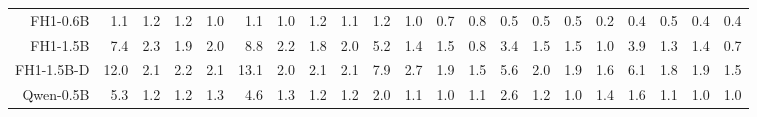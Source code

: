 \documentclass[letterpaper]{article}
\begin{document}
\begin{table}[t]
{\begin{tabular}{rrrrr|rrrr|rrrr|rrrr|rrrr}
FH1-0.6B & \cellcolor[HTML]{F8CCCC}1.1 & \cellcolor[HTML]{F8CDCC}1.2 & \cellcolor[HTML]{F8CDCC}1.2 & \cellcolor[HTML]{F8CCCC}1.0 & \cellcolor[HTML]{F8CCCC}1.1 & \cellcolor[HTML]{F8CCCC}1.0 & \cellcolor[HTML]{F8CDCC}1.2 & \cellcolor[HTML]{F8CCCC}1.1 & \cellcolor[HTML]{F9D0CC}1.2 & \cellcolor[HTML]{F9CFCC}1.0 & \cellcolor[HTML]{F8CCCC}0.7 & \cellcolor[HTML]{F8CDCC}0.8 & \cellcolor[HTML]{F8CECC}0.5 & \cellcolor[HTML]{F8CECC}0.5 & \cellcolor[HTML]{F8CECC}0.5 & \cellcolor[HTML]{F8CCCC}0.2 & \cellcolor[HTML]{F8CCCC}0.4 & \cellcolor[HTML]{F8CDCC}0.5 & \cellcolor[HTML]{F8CCCC}0.4 & \cellcolor[HTML]{F8CCCC}0.4 \\
FH1-1.5B & \cellcolor[HTML]{FDE9CC}7.4 & \cellcolor[HTML]{F9D2CC}2.3 & \cellcolor[HTML]{F9D0CC}1.9 & \cellcolor[HTML]{F9D1CC}2.0 & \cellcolor[HTML]{FEEFCC}8.8 & \cellcolor[HTML]{F9D1CC}2.2 & \cellcolor[HTML]{F9D0CC}1.8 & \cellcolor[HTML]{F9D0CC}2.0 & \cellcolor[HTML]{FDF2CC}5.2 & \cellcolor[HTML]{F9D3CC}1.4 & \cellcolor[HTML]{F9D3CC}1.5 & \cellcolor[HTML]{F8CDCC}0.8 & \cellcolor[HTML]{FCE2CC}3.4 & \cellcolor[HTML]{FAD5CC}1.5 & \cellcolor[HTML]{FAD5CC}1.5 & \cellcolor[HTML]{F9D2CC}1.0 & \cellcolor[HTML]{FDE8CC}3.9 & \cellcolor[HTML]{F9D3CC}1.3 & \cellcolor[HTML]{FAD5CC}1.4 & \cellcolor[HTML]{F9CFCC}0.7 \\
FH1-1.5B-D & \cellcolor[HTML]{EFEFCC}12.0 & \cellcolor[HTML]{F9D1CC}2.1 & \cellcolor[HTML]{F9D1CC}2.2 & \cellcolor[HTML]{F9D1CC}2.1 & \cellcolor[HTML]{EAEECC}13.1 & \cellcolor[HTML]{F9D0CC}2.0 & \cellcolor[HTML]{F9D1CC}2.1 & \cellcolor[HTML]{F9D1CC}2.1 & \cellcolor[HTML]{DDEBCC}7.9 & \cellcolor[HTML]{FBDECC}2.7 & \cellcolor[HTML]{FAD7CC}1.9 & \cellcolor[HTML]{F9D3CC}1.5 & \cellcolor[HTML]{FEF2CC}5.6 & \cellcolor[HTML]{FAD8CC}2.0 & \cellcolor[HTML]{FAD8CC}1.9 & \cellcolor[HTML]{FAD6CC}1.6 & \cellcolor[HTML]{F3F0CC}6.1 & \cellcolor[HTML]{FAD7CC}1.8 & \cellcolor[HTML]{FAD8CC}1.9 & \cellcolor[HTML]{FAD5CC}1.5 \\
Qwen-0.5B & \cellcolor[HTML]{FCE0CC}5.3 & \cellcolor[HTML]{F8CDCC}1.2 & \cellcolor[HTML]{F8CDCC}1.2 & \cellcolor[HTML]{F8CDCC}1.3 & \cellcolor[HTML]{FBDCCC}4.6 & \cellcolor[HTML]{F8CDCC}1.3 & \cellcolor[HTML]{F8CDCC}1.2 & \cellcolor[HTML]{F8CDCC}1.2 & \cellcolor[HTML]{FAD7CC}2.0 & \cellcolor[HTML]{F9CFCC}1.1 & \cellcolor[HTML]{F8CECC}1.0 & \cellcolor[HTML]{F9D0CC}1.1 & \cellcolor[HTML]{FBDDCC}2.6 & \cellcolor[HTML]{F9D3CC}1.2 & \cellcolor[HTML]{F9D2CC}1.0 & \cellcolor[HTML]{FAD5CC}1.4 & \cellcolor[HTML]{FAD5CC}1.6 & \cellcolor[HTML]{F9D2CC}1.1 & \cellcolor[HTML]{F9D1CC}1.0 & \cellcolor[HTML]{F9D1CC}1.0 \\

\end{tabular}}
\end{table}
\end{document}
